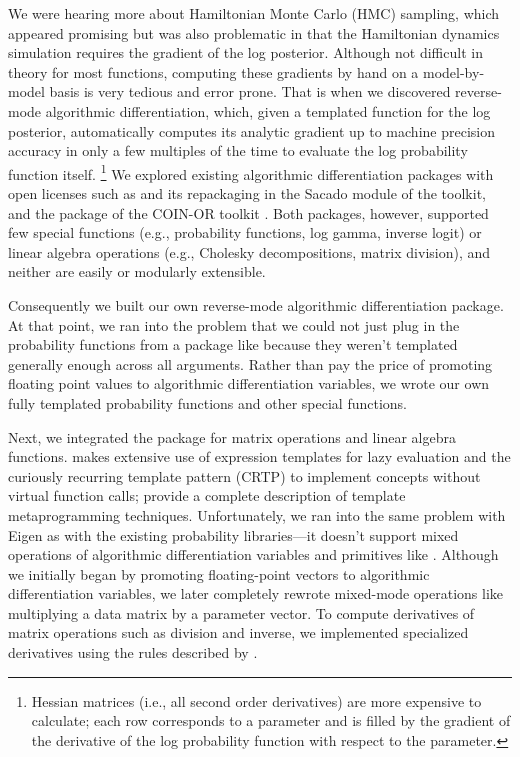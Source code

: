 \documentclass[article]{jss}
\begin{document}
We were hearing more about Hamiltonian Monte Carlo (HMC) sampling,
which appeared promising but was also problematic in that the
Hamiltonian dynamics simulation requires the gradient of the log
posterior.  Although not difficult in theory for most functions,
computing these gradients by hand on a model-by-model basis is very
tedious and error prone.  That is when we discovered reverse-mode
algorithmic differentiation, which, given a templated 
function for the log posterior, automatically computes its analytic
gradient up to machine precision accuracy in only a few multiples of
the time to evaluate the log probability function itself.%
%
\footnote{Hessian matrices (i.e., all second order derivatives) are
  more expensive to calculate; each row corresponds to a parameter and
  is filled by the gradient of the derivative of the log probability
  function with respect to the parameter.}
%
We explored existing algorithmic differentiation packages with open
licenses such as  \citep{Gay:2005} and its repackaging in the
Sacado module of the  toolkit, and the 
package of the COIN-OR toolkit \citep{BellBurke:2008}.  Both packages,
however, supported few special functions (e.g., probability functions,
log gamma, inverse logit) or linear algebra operations (e.g., Cholesky
decompositions, matrix division), and neither are easily or modularly
extensible.

Consequently we built our own reverse-mode algorithmic differentiation package.
At that point, we ran into the problem that we could not just plug in
the probability functions from a package like  because they
weren't templated generally enough across all arguments.  Rather
than pay the price of promoting floating point values to algorithmic
differentiation variables, we wrote our own fully templated
probability functions and other special functions.

Next, we integrated the  package  for matrix
operations and linear algebra functions.   makes extensive
use of expression templates for lazy evaluation and the curiously
recurring template pattern (CRTP) to implement concepts without
virtual function calls; \cite{VandevoordeJosuttis:2002} provide a
complete description of template metaprogramming techniques.
Unfortunately, we ran into the same problem with Eigen as with the
existing probability libraries---it doesn't support mixed operations
of algorithmic differentiation variables and primitives like
.  Although we initially began by promoting
floating-point vectors to algorithmic differentiation variables, we
later completely rewrote mixed-mode operations like multiplying a data
matrix by a parameter vector.  To compute derivatives of matrix
operations such as division and inverse, we implemented specialized
derivatives using the rules described by \cite{Giles:2008}.
\end{document}
